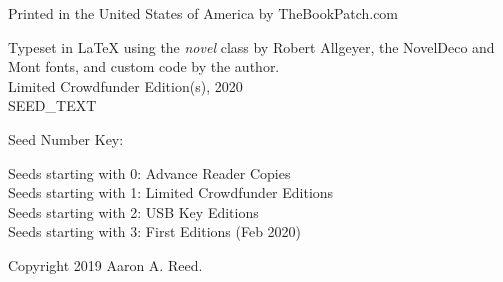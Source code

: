 \thispagestyle{empty}

\NewFontFamily{}
\vspace*{6\nbs}
\begin{center}
{\mont {}}
\end{center}
\clearpage

\thispagestyle{empty}
\null %
\clearpage

\thispagestyle{empty}
\vspace*{6\nbs}
\begin{center}
{\mont {}}

\vspace*{3\nbs}

{\mont {}}

\vfill
Printed in the United States of America by TheBookPatch.com

\end{center}
\clearpage

\thispagestyle{empty}
\null\vfill

\begin{legalese}
Typeset in LaTeX using the \textit{novel} class by Robert Allgeyer, the NovelDeco and Mont fonts, and custom code by the author. \\
\vspace{1\nbs}
Limited Crowdfunder Edition(s), 2020 \\
\vspace{1\nbs}
SEED_TEXT \\

\vspace{1\nbs}

\begin{parascale}[0.88]
Seed Number Key: \\
\begin{adjustwidth}{2em}{2em}
Seeds starting with 0: Advance Reader Copies \\
Seeds starting with 1: Limited Crowdfunder Editions \\
Seeds starting with 2: USB Key Editions \\
Seeds starting with 3: First Editions (Feb 2020)
\end{adjustwidth}
\end{parascale}
\vspace{1\nbs}

Copyright 2019 Aaron A. Reed.
\end{legalese}
\clearpage

